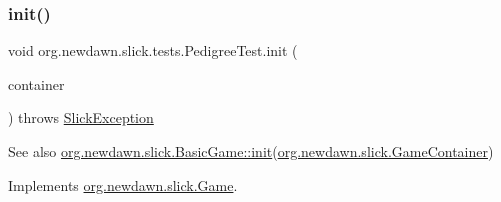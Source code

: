 \subsubsection{\texorpdfstring{init()}{init()}}
{\footnotesize\ttfamily void org.\+newdawn.\+slick.\+tests.\+Pedigree\+Test.\+init (\begin{DoxyParamCaption}\item[{\mbox{\hyperlink{classorg_1_1newdawn_1_1slick_1_1_game_container}{Game\+Container}}}]{container }\end{DoxyParamCaption}) throws \mbox{\hyperlink{classorg_1_1newdawn_1_1slick_1_1_slick_exception}{Slick\+Exception}}\hspace{0.3cm}{\ttfamily [inline]}}

\begin{DoxySeeAlso}{See also}
\mbox{\hyperlink{classorg_1_1newdawn_1_1slick_1_1_basic_game_a8af0900217e4d389249f71367b22d114}{org.\+newdawn.\+slick.\+Basic\+Game\+::init}}(\mbox{\hyperlink{classorg_1_1newdawn_1_1slick_1_1_game_container}{org.\+newdawn.\+slick.\+Game\+Container}}) 
\end{DoxySeeAlso}


Implements \mbox{\hyperlink{interfaceorg_1_1newdawn_1_1slick_1_1_game_ad2dd6affab08bb8fdb5fab0815957b7a}{org.\+newdawn.\+slick.\+Game}}.


